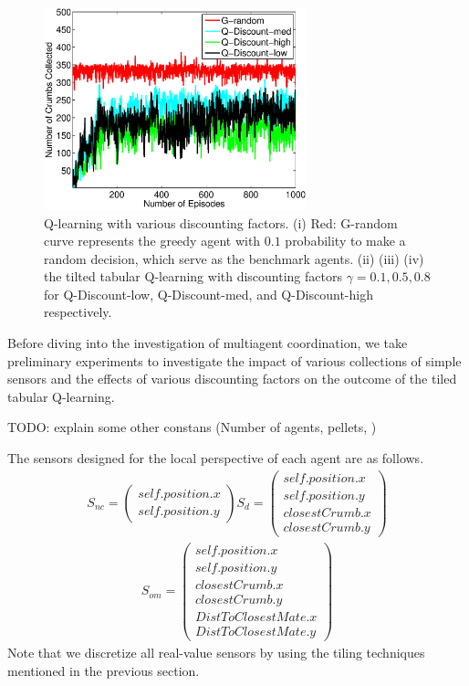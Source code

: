 \documentclass[conference]{IEEEtran}
\begin{document}
\begin{figure}[!t]
\centering
\includegraphics[width=3.0in]{./figures/RL/init_setup2.eps}
\caption{Q-learning with various discounting factors. (i) Red: G-random curve
    represents the greedy agent with $0.1$ probability to make a random
    decision, which serve as the benchmark agents. 
    (ii) (iii) (iv) the tilted tabular Q-learning with discounting factors
    $\gamma = 0.1, 0.5, 0.8$ for Q-Discount-low, Q-Discount-med, and
    Q-Discount-high respectively.}
\label{fig:RL_init2}
\end{figure}

Before diving into the investigation of multiagent coordination, we take 
preliminary experiments to investigate the impact of various collections of
simple sensors and the effects of various discounting factors on the outcome
of the tiled tabular Q-learning.

TODO: explain some other constans (Number of agents, pellets, )


The sensors designed for the local perspective of each agent are as follows. 
\begin{align}
    S_{nc} = \left( \begin{array}{c}
      self.position.x \\
      self.position.y 
  \end{array} \right)
    S_{d} = \left( \begin{array}{c}
      self.position.x \\
      self.position.y \\
      closestCrumb.x \\
      closestCrumb.y 
  \end{array} \right)
    \nonumber
\end{align}
\begin{align}
        S_{om} = \left( \begin{array}{c}
      self.position.x \\
      self.position.y \\
      closestCrumb.x \\
      closestCrumb.y  \\
      DistToClosestMate.x \\
      DistToClosestMate.y 
  \end{array} \right)
        \nonumber
\end{align}
Note that we discretize all real-value sensors by using the tiling
techniques mentioned in the previous section. 
\end{document}

